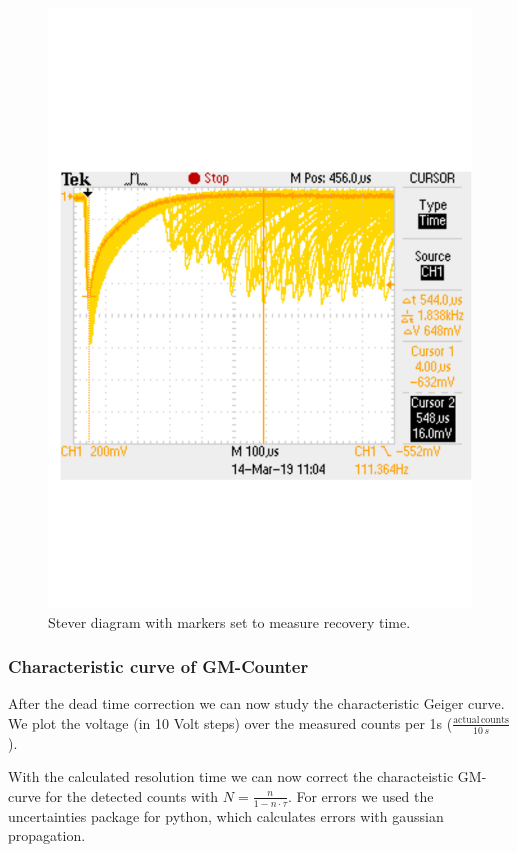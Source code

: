 \begin{figure}[H]
	\centering
	\includegraphics[width=\textwidth]{../Figures/F0001TEK.pdf}
	\caption{Stever diagram with markers set to measure recovery time.}
	\label{fig:SteverRecovery}
\end{figure}

\subsubsection{Characteristic curve of GM-Counter}
After the dead time correction we can now study the characteristic Geiger curve.
We plot the voltage (in 10 Volt steps) over the measured counts per 1s ($\frac{\mathrm{actual\,counts}}{10\,s}$).

With the calculated resolution time we can now correct the characteistic GM-curve for the detected counts with $N =\frac{n}{1-n\cdot\tau}$. 
For errors we used the uncertainties package for python, which calculates errors with gaussian propagation.

